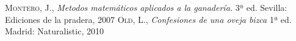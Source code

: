 \begin{thebibliography}{a}
 \textsc{Montero, J.},
\textit{Metodos matemáticos aplicados a la ganadería.}
3ª ed. Sevilla: Ediciones de la pradera, 2007  
 \textsc{Old, L.},
\textit{Confesiones de una oveja bizca}
1ª ed. Madrid: Naturalistic, 2010 
\end{thebibliography}